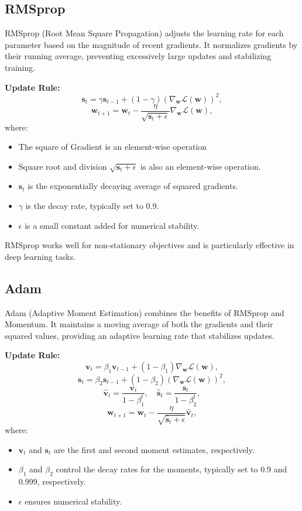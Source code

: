\documentclass{article}
\begin{document}
\subsection{RMSprop}
RMSprop (Root Mean Square Propagation) adjusts the learning rate for each parameter based on the magnitude of recent gradients. It normalizes gradients by their running average, preventing excessively large updates and stabilizing training.

\textbf{Update Rule:}
\[
\mathbf{s}_t = \gamma \mathbf{s}_{t-1} + (1 - \gamma) (\nabla_{\mathbf{w}} \mathcal{L}(\mathbf{w}))^2,
\]
\[
\mathbf{w}_{t+1} = \mathbf{w}_t - \frac{\eta}{\sqrt{\mathbf{s}_t + \epsilon}} \nabla_{\mathbf{w}} \mathcal{L}(\mathbf{w}),
\]
where:
\begin{itemize}
    \item The square of Gradient is an element-wise operation
    \item Square root and division $\sqrt{\mathbf{s}_t+\epsilon}$ is also an element-wise operation.
    \item $\mathbf{s}_t$ is the exponentially decaying average of squared gradients.
    \item $\gamma$ is the decay rate, typically set to 0.9.
    \item $\epsilon$ is a small constant added for numerical stability.
\end{itemize}

RMSprop works well for non-stationary objectives and is particularly effective in deep learning tasks.

\subsection{Adam}
Adam (Adaptive Moment Estimation) combines the benefits of RMSprop and Momentum. It maintains a moving average of both the gradients and their squared values, providing an adaptive learning rate that stabilizes updates.

\textbf{Update Rule:}
\[
\mathbf{v}_t = \beta_1 \mathbf{v}_{t-1} + (1 - \beta_1) \nabla_{\mathbf{w}} \mathcal{L}(\mathbf{w}),
\]
\[
\mathbf{s}_t = \beta_2 \mathbf{s}_{t-1} + (1 - \beta_2) (\nabla_{\mathbf{w}} \mathcal{L}(\mathbf{w}))^2,
\]
\[
\hat{\mathbf{v}}_t = \frac{\mathbf{v}_t}{1 - \beta_1^t}, \quad \hat{\mathbf{s}}_t = \frac{\mathbf{s}_t}{1 - \beta_2^t},
\]
\[
\mathbf{w}_{t+1} = \mathbf{w}_t - \frac{\eta}{\sqrt{\hat{\mathbf{s}}_t + \epsilon}} \hat{\mathbf{v}}_t,
\]
where:
\begin{itemize}
    \item $\mathbf{v}_t$ and $\mathbf{s}_t$ are the first and second moment estimates, respectively.
    \item $\beta_1$ and $\beta_2$ control the decay rates for the moments, typically set to 0.9 and 0.999, respectively.
    \item $\epsilon$ ensures numerical stability.
\end{itemize}
\end{document}
